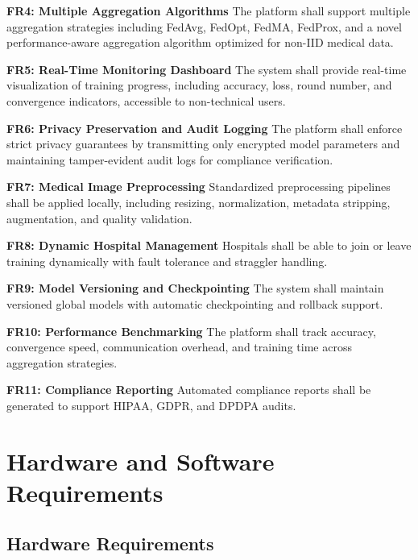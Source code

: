 \textbf{FR4: Multiple Aggregation Algorithms}  
The platform shall support multiple aggregation strategies including FedAvg, FedOpt, FedMA, FedProx, and a novel performance-aware aggregation algorithm optimized for non-IID medical data.

\textbf{FR5: Real-Time Monitoring Dashboard}  
The system shall provide real-time visualization of training progress, including accuracy, loss, round number, and convergence indicators, accessible to non-technical users.

\textbf{FR6: Privacy Preservation and Audit Logging}  
The platform shall enforce strict privacy guarantees by transmitting only encrypted model parameters and maintaining tamper-evident audit logs for compliance verification.

\textbf{FR7: Medical Image Preprocessing}  
Standardized preprocessing pipelines shall be applied locally, including resizing, normalization, metadata stripping, augmentation, and quality validation.

\textbf{FR8: Dynamic Hospital Management}  
Hospitals shall be able to join or leave training dynamically with fault tolerance and straggler handling.

\textbf{FR9: Model Versioning and Checkpointing}  
The system shall maintain versioned global models with automatic checkpointing and rollback support.

\textbf{FR10: Performance Benchmarking}  
The platform shall track accuracy, convergence speed, communication overhead, and training time across aggregation strategies.

\textbf{FR11: Compliance Reporting}  
Automated compliance reports shall be generated to support HIPAA, GDPR, and DPDPA audits.

\section{Hardware and Software Requirements}

\subsection{Hardware Requirements}

